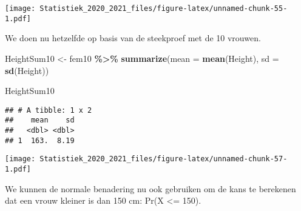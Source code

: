 \documentclass[
  12pt,dutch,coursenotes]{book}
\newenvironment{Shaded}{\begin{snugshade}}{\end{snugshade}}
\newcommand{\DataTypeTok}[1]{\textcolor[rgb]{0.13,0.29,0.53}{#1}}
\newcommand{\DecValTok}[1]{\textcolor[rgb]{0.00,0.00,0.81}{#1}}
\newcommand{\KeywordTok}[1]{\textcolor[rgb]{0.13,0.29,0.53}{\textbf{#1}}}
\newcommand{\NormalTok}[1]{#1}
\newcommand{\OperatorTok}[1]{\textcolor[rgb]{0.81,0.36,0.00}{\textbf{#1}}}
\newcommand{\StringTok}[1]{\textcolor[rgb]{0.31,0.60,0.02}{#1}}
\theoremstyle{definition}
\theoremstyle{definition}
\theoremstyle{definition}
\theoremstyle{remark}
\begin{document}
\texttt{[image: Statistiek\_2020\_2021\_files/figure-latex/unnamed-chunk-55-1.pdf]}

We doen nu hetzelfde op basis van de steekproef met de 10 vrouwen.

\begin{Shaded}
\begin{Highlighting}[]
\NormalTok{HeightSum10 \textless{}{-}}\StringTok{ }\NormalTok{fem10 }\OperatorTok{\%\textgreater{}\%}\StringTok{ }\KeywordTok{summarize}\NormalTok{(}\DataTypeTok{mean =} \KeywordTok{mean}\NormalTok{(Height), }
    \DataTypeTok{sd =} \KeywordTok{sd}\NormalTok{(Height))}

\NormalTok{HeightSum10}
\end{Highlighting}
\end{Shaded}

\begin{verbatim}
## # A tibble: 1 x 2
##    mean    sd
##   <dbl> <dbl>
## 1  163.  8.19
\end{verbatim}

\begin{Shaded}
\end{Shaded}

\texttt{[image: Statistiek\_2020\_2021\_files/figure-latex/unnamed-chunk-57-1.pdf]}

We kunnen de normale benadering nu ook gebruiken om de kans te berekenen dat een vrouw kleiner is dan 150 cm: Pr(X \textless= 150).
\end{document}
